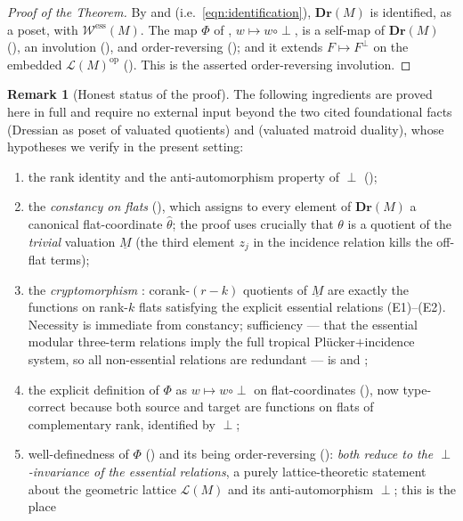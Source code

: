 \documentclass{article}
\theoremstyle{definition}
\newtheorem{remark}[theorem]{Remark}
\newcommand{\op}{\operatorname{op}}
\newcommand{\Dr}{\mathbf{Dr}}
\newcommand{\cLL}{\mathcal{L}}
\newcommand{\cW}{\mathcal{W}}
\begin{document}
\begin{proof}[Proof of the Theorem]
By  and  (i.e.\ \eqref{eqn:identification}),
$\Dr(M)$ is identified, as a poset, with $\cW^{\mathrm{ess}}(M)$. The map $\Phi$ of ,
$w\mapsto w\circ\perp$, is a self-map of $\Dr(M)$ (), an involution (),
and order-reversing (); and it extends $F\mapsto F^{\perp}$ on the embedded
$\cLL(M)^{\op}$ (). This is the asserted order-reversing involution.
\end{proof}

\begin{remark}[Honest status of the proof]\label{rmk:honest}
The following ingredients are proved here in full and require no external input beyond the two cited
foundational facts  (Dressian as poset of valuated quotients) and
 (valuated matroid duality), whose hypotheses we verify in the present setting:
\begin{enumerate}
\item the rank identity and the anti-automorphism property of $\perp$ ();
\item the \emph{constancy on flats} (), which assigns to every element of
$\Dr(M)$ a canonical flat-coordinate $\widehat\theta$; the proof uses crucially that $\theta$ is a
quotient of the \emph{trivial} valuation $\underline M$ (the third element $z_j$ in the incidence
relation kills the off-flat terms);
\item the \emph{cryptomorphism} : corank-$(r-k)$ quotients of
$\underline M$ are exactly the functions on rank-$k$ flats satisfying the explicit essential
relations (E1)--(E2). Necessity is immediate from constancy; sufficiency --- that the essential
modular three-term relations imply the full tropical Pl\"ucker$+$incidence system, so all
non-essential relations are redundant --- is  and ;
\item the explicit definition of $\Phi$ as $w\mapsto w\circ\perp$ on flat-coordinates
(), now type-correct because both source and target are functions on flats of
complementary rank, identified by $\perp$;
\item well-definedness of $\Phi$ () and its being order-reversing ():
\emph{both reduce to the $\perp$-invariance of the essential relations}, a purely lattice-theoretic
statement about the geometric lattice $\cLL(M)$ and its anti-automorphism $\perp$; this is the place

\end{enumerate}
\end{remark}
\end{document}
